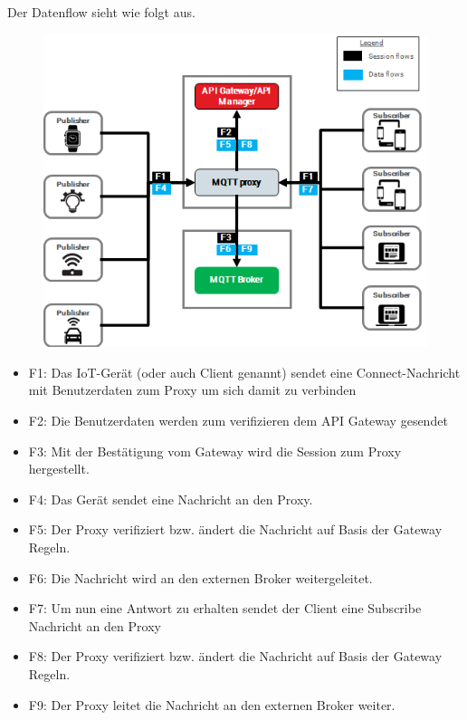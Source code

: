         Der Datenflow sieht wie folgt aus.
        \begin{figure}[h]%
            \centering
            \includegraphics[width=14cm]{tex/bilder/2_grundlagen/axway-mqtt-proxy02_short.png}
            \label{fig:axway-proxy}
        \end{figure}
        \begin{itemize}
            \item F1: Das \ac{IoT}-Gerät (oder auch Client genannt) sendet eine Connect-Nachricht mit Benutzerdaten zum Proxy um sich damit zu verbinden
            \item F2: Die Benutzerdaten werden zum verifizieren dem API Gateway gesendet
            \item F3: Mit der Bestätigung vom Gateway wird die Session zum Proxy hergestellt.
            \item F4: Das Gerät sendet eine Nachricht an den Proxy.
            \item F5: Der Proxy verifiziert bzw. ändert die Nachricht auf Basis der Gateway Regeln.
            \item F6: Die Nachricht wird an den externen Broker weitergeleitet.
            \item F7: Um nun eine Antwort zu erhalten sendet der Client eine Subscribe Nachricht an den Proxy
            \item F8: Der Proxy verifiziert bzw. ändert die Nachricht auf Basis der Gateway Regeln.
            \item F9: Der Proxy leitet die Nachricht an den externen Broker weiter.
        \end{itemize}
